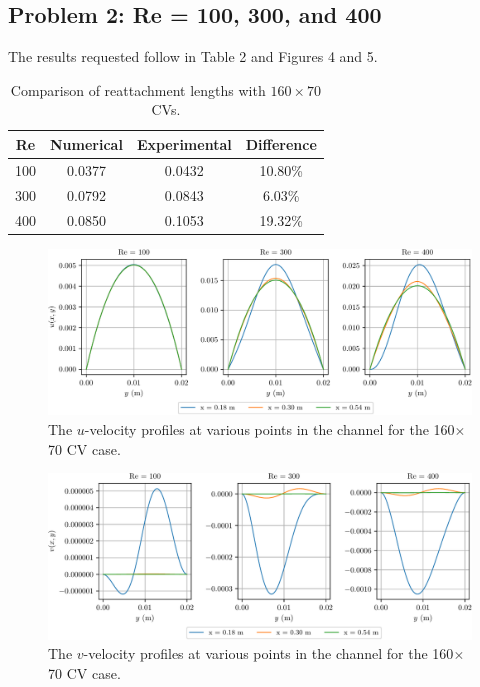 \documentclass{article}
\begin{document}
\subsection{Problem 2: Re = 100, 300, and 400}

The results requested follow in Table 2 and Figures 4 and 5.

\def\arraystretch{1.3}
\begin{table}[H]
	\small
	\centering
	\caption{Comparison of reattachment lengths with $160 \times 70$ CVs.}
	\vspace{0.2cm}
	\begin{tabular}{c|c|c|c}
		Re & Numerical & Experimental & Difference \\
		\hline
		100 & 0.0377 & 0.0432 & 10.80\% \\
		300 & 0.0792 & 0.0843 & 6.03\% \\
		400 & 0.0850 & 0.1053 & 19.32\% \\
	\end{tabular}
	\label{table:b-temps}
\end{table}

\begin{figure}[H]
	\centering
	\includegraphics[width=0.9\linewidth]{../results/2_u}
	\caption{The $u$-velocity profiles at various points in the channel for the 160$\times$70 CV case.}
	\label{fig:2_u}
\end{figure}

\begin{figure}[H]
	\centering
	\includegraphics[width=0.9\linewidth]{../results/2_v}
	\caption{The $v$-velocity profiles at various points in the channel for the 160$\times$70 CV case.}
	\label{fig:2_v}
\end{figure}
\end{document}
